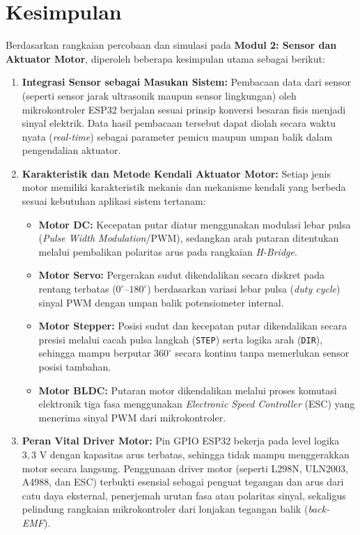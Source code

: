 \section{Kesimpulan}

Berdasarkan rangkaian percobaan dan simulasi pada \textbf{Modul 2: Sensor dan Aktuator Motor}, diperoleh beberapa kesimpulan utama sebagai berikut:

\begin{enumerate}
    \item \textbf{Integrasi Sensor sebagai Masukan Sistem:} Pembacaan data dari sensor (seperti sensor jarak ultrasonik maupun sensor lingkungan) oleh mikrokontroler ESP32 berjalan sesuai prinsip konversi besaran fisis menjadi sinyal elektrik. Data hasil pembacaan tersebut dapat diolah secara waktu nyata (\textit{real-time}) sebagai parameter pemicu maupun umpan balik dalam pengendalian aktuator.

    \item \textbf{Karakteristik dan Metode Kendali Aktuator Motor:} Setiap jenis motor memiliki karakteristik mekanis dan mekanisme kendali yang berbeda sesuai kebutuhan aplikasi sistem tertanam:
    \begin{itemize}
        \item \textbf{Motor DC:} Kecepatan putar diatur menggunakan modulasi lebar pulsa (\textit{Pulse Width Modulation}/PWM), sedangkan arah putaran ditentukan melalui pembalikan polaritas arus pada rangkaian \textit{H-Bridge}.
        \item \textbf{Motor Servo:} Pergerakan sudut dikendalikan secara diskret pada rentang terbatas ($0^\circ$--$180^\circ$) berdasarkan variasi lebar pulsa (\textit{duty cycle}) sinyal PWM dengan umpan balik potensiometer internal.
        \item \textbf{Motor Stepper:} Posisi sudut dan kecepatan putar dikendalikan secara presisi melalui cacah pulsa langkah (\texttt{STEP}) serta logika arah (\texttt{DIR}), sehingga mampu berputar $360^\circ$ secara kontinu tanpa memerlukan sensor posisi tambahan.
        \item \textbf{Motor BLDC:} Putaran motor dikendalikan melalui proses komutasi elektronik tiga fasa menggunakan \textit{Electronic Speed Controller} (ESC) yang menerima sinyal PWM dari mikrokontroler.
    \end{itemize}

    \item \textbf{Peran Vital Driver Motor:} Pin GPIO ESP32 bekerja pada level logika $3,3$ V dengan kapasitas arus terbatas, sehingga tidak mampu menggerakkan motor secara langsung. Penggunaan driver motor (seperti L298N, ULN2003, A4988, dan ESC) terbukti esensial sebagai penguat tegangan dan arus dari catu daya eksternal, penerjemah urutan fasa atau polaritas sinyal, sekaligus pelindung rangkaian mikrokontroler dari lonjakan tegangan balik (\textit{back-EMF}).


\end{enumerate}
